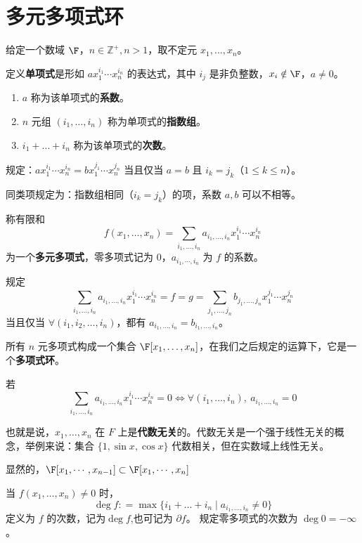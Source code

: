 \section{多元多项式环}
\begin{definition}\label{p1:concept:c1-l1278}
	给定一个数域 \(\F \)，\( n \in \mathbb{Z}^+, n>1 \)，取不定元 \( x_1,\dots,x_n \)。
	
	定义\textbf{单项式}是形如 \( a x_1^{i_1} \cdots x_n^{i_n} \) 的表达式，其中 \( i_j \) 是非负整数，\( x_i \notin \F \)，\( a \neq 0 \)。
	\begin{enumerate}
		\item \( a \) 称为该单项式的\textbf{系数}。
		\item \( n \) 元组 \( (i_1,\dots,i_n) \) 称为单项式的\textbf{指数组}。
		\item \( i_1+\dots+i_n \) 称为该单项式的\textbf{次数}。
	\end{enumerate}
	
	
	规定：\( a x_1^{i_1} \cdots x_n^{i_n} = b x_1^{j_1} \cdots x_n^{j_n} \) 当且仅当 \( a=b \) 且 \( i_k=j_k \)（\( 1 \le k \le n \)）。
	
	同类项规定为：指数组相同（\( i_k=j_k \)）的项，系数 \( a,b \) 可以不相等。
	
	称有限和
	\[
	f(x_1,\dots,x_n)=\sum_{i_1,\dots,i_n} a_{i_1,\dots,i_n} x_1^{i_1} \cdots x_n^{i_n}
	\]
	为一个\textbf{多元多项式}，零多项式记为 \( 0 \)，\( a_{i_1,\cdots,i_n} \) 为 \( f \) 的系数。
	
	规定
	\[
	\sum_{i_1,\dots,i_n} a_{i_1,\dots,i_n} x_1^{i_1} \cdots x_n^{i_n} = f = g = \sum_{j_1,\dots,j_n} b_{j_1,\dots,j_n} x_1^{j_1} \cdots x_n^{j_n}
	\]
	当且仅当 \( \forall (i_1,i_2,\dots,i_n) \)，都有 \( a_{i_1,\dots,i_n} = b_{i_1,\dots,i_n} \)。
	
	所有 \( n \) 元多项式构成一个集合 \( \F[x_1,\dots,x_n] \)，在我们之后规定的运算下，它是一个\textbf{多项式环}。
	
	若\[
	\sum_{i_1,\dots,i_n} a_{i_1,\dots,i_n} x_1^{i_1} \cdots x_n^{i_n} = 0 \iff \forall (i_1,\dots,i_n),\ a_{i_1,\dots,i_n}=0
	\]
	
	也就是说，\( x_1,\dots,x_n \) 在 \( F \) 上是\textbf{代数无关}的。代数无关是一个强于线性无关的概念，举例来说：集合 \( \{1,\sin x,\cos x\} \) 代数相关，但在实数域上线性无关。
	
\end{definition}
显然的，$\F[x_1,\cdots,x_{n-1}]\subset\F[x_1,\cdots,x_{n}]$
\begin{definition}\label{p1:concept:c1-l1315}
	当 \( f(x_1,\dots,x_n) \neq 0 \) 时，
	\[
	\deg f: = \max\{i_1+\dots+i_n \mid a_{i_1,\dots,i_n} \neq 0\}
	\]
	定义为 \( f \) 的次数，记为$\deg f$,也可记为 \( \partial f \)。
	规定零多项式的次数为 \( \deg 0 = -\infty \)。
\end{definition}
